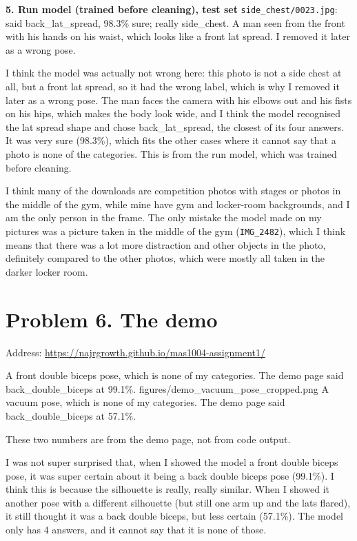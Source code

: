 \documentclass[11pt]{article}
\begin{document}
  {\textbf{5. Run model (trained before cleaning), test set} \texttt{side\_chest/0023.jpg}: said back\_lat\_spread, 98.3\% sure; really side\_chest. A man seen from the front with his hands on his waist, which looks like a front lat spread. I removed it later as a wrong pose.

  I think the model was actually not wrong here: this photo is not a side chest at all, but a front lat spread, so it had the wrong label, which is why I removed it later as a wrong pose. The man faces the camera with his elbows out and his fists on his hips, which makes the body look wide, and I think the model recognised the lat spread shape and chose back\_lat\_spread, the closest of its four answers. It was very sure (98.3\%), which fits the other cases where it cannot say that a photo is none of the categories. This is from the run model, which was trained before cleaning.}


I think many of the downloads are competition photos with stages or photos in the middle of the gym, while mine have gym and locker-room backgrounds, and I am the only person in the frame. The only mistake the model made on my pictures was a picture taken in the middle of the gym (\texttt{IMG\_2482}), which I think means that there was a lot more distraction and other objects in the photo, definitely compared to the other photos, which were mostly all taken in the darker locker room.

\section*{Problem 6. The demo}

Address: \url{https://najrgrowth.github.io/mas1004-assignment1/}

           {A front double biceps pose, which is none of my categories. The
            demo page said back\_double\_biceps at 99.1\%.}
           {figures/demo_vacuum_pose_cropped.png}
           {A vacuum pose, which is none of my categories. The demo page said
            back\_double\_biceps at 57.1\%.}

These two numbers are from the demo page, not from code output.

I was not super surprised that, when I showed the model a front double biceps pose, it was super certain about it being a back double biceps pose (99.1\%). I think this is because the silhouette is really, really similar. When I showed it another pose with a different silhouette (but still one arm up and the lats flared), it still thought it was a back double biceps, but less certain (57.1\%). The model only has 4 answers, and it cannot say that it is none of those.
\end{document}
